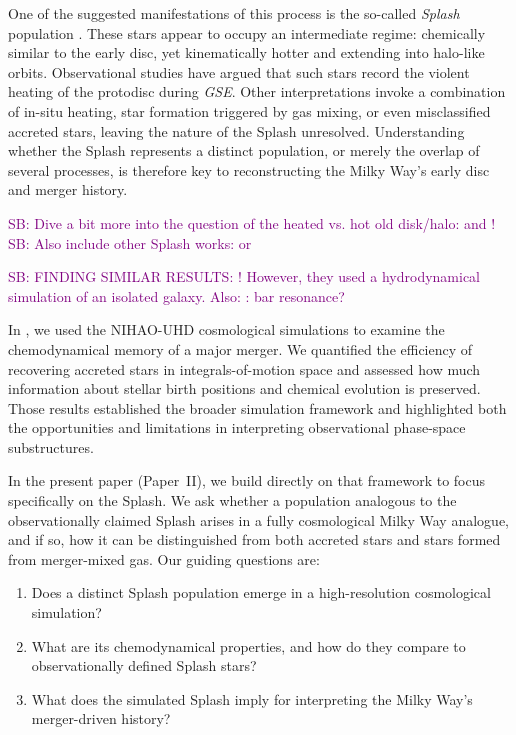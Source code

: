 \documentclass[fleqn,usenatbib]{mnras}
\newcommand{\SB}[1]{{\textcolor{purple}{SB: #1}}}
\begin{document}
One of the suggested manifestations of this process is the so-called \textit{Splash} population \citep{Belokurov2020, Belokurov2022}. These stars appear to occupy an intermediate regime: chemically similar to the early disc, yet kinematically hotter and extending into halo-like orbits. Observational studies have argued that such stars record the violent heating of the protodisc during \textit{GSE}. Other interpretations invoke a combination of in-situ heating, star formation triggered by gas mixing, or even misclassified accreted stars, leaving the nature of the Splash unresolved. Understanding whether the Splash represents a distinct population, or merely the overlap of several processes, is therefore key to reconstructing the Milky Way’s early disc and merger history.

\SB{Dive a bit more into the question of the heated vs. hot old disk/halo: \citet{DiMatteo2019} and \citet{Bonaca2017, Bonaca2020}!}
\SB{Also include other Splash works: \citet{Dillamore2022} or \citet{Kisku2025}}

\SB{FINDING SIMILAR RESULTS: \citet{Amarante2020}! However, they used a hydrodynamical simulation of an isolated galaxy. Also: \citet{Dillamore2023}: bar resonance?}

In \citet[][hereafter ]{Buder2025c}, we used the NIHAO-UHD cosmological simulations \citep{Buck2020, Buck2021} to examine the chemodynamical memory of a major merger. We quantified the efficiency of recovering accreted stars in integrals-of-motion space and assessed how much information about stellar birth positions and chemical evolution is preserved. Those results established the broader simulation framework and highlighted both the opportunities and limitations in interpreting observational phase-space substructures.

In the present paper (Paper~II), we build directly on that framework to focus specifically on the Splash. We ask whether a population analogous to the observationally claimed Splash arises in a fully cosmological Milky Way analogue, and if so, how it can be distinguished from both accreted stars and stars formed from merger-mixed gas. 
Our guiding questions are:
\begin{enumerate}[leftmargin=2em,labelwidth=0em]
    \item Does a distinct Splash population emerge in a high-resolution cosmological simulation?
    \item What are its chemodynamical properties, and how do they compare to observationally defined Splash stars?
    \item What does the simulated Splash imply for interpreting the Milky Way’s merger-driven history?
\end{enumerate}
\end{document}
